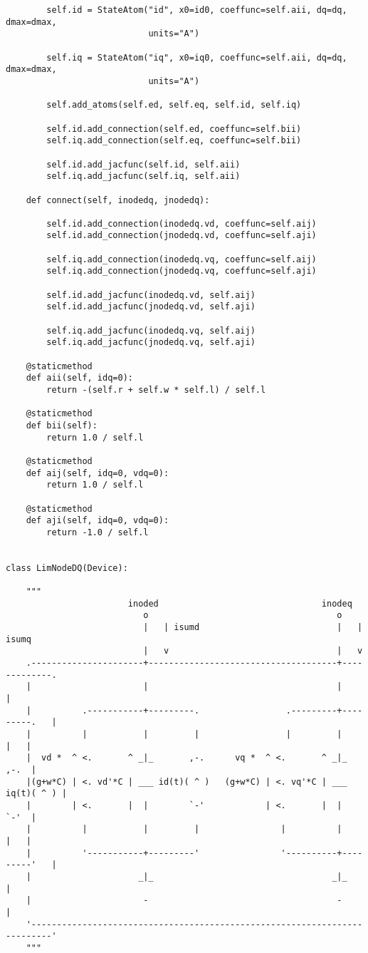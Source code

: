 \begin{lstlisting}
        self.id = StateAtom("id", x0=id0, coeffunc=self.aii, dq=dq, dmax=dmax,
                            units="A")

        self.iq = StateAtom("iq", x0=iq0, coeffunc=self.aii, dq=dq, dmax=dmax,
                            units="A")

        self.add_atoms(self.ed, self.eq, self.id, self.iq)

        self.id.add_connection(self.ed, coeffunc=self.bii)
        self.iq.add_connection(self.eq, coeffunc=self.bii)

        self.id.add_jacfunc(self.id, self.aii)
        self.iq.add_jacfunc(self.iq, self.aii)

    def connect(self, inodedq, jnodedq):

        self.id.add_connection(inodedq.vd, coeffunc=self.aij)
        self.id.add_connection(jnodedq.vd, coeffunc=self.aji)

        self.iq.add_connection(inodedq.vq, coeffunc=self.aij)
        self.iq.add_connection(jnodedq.vq, coeffunc=self.aji)

        self.id.add_jacfunc(inodedq.vd, self.aij)
        self.id.add_jacfunc(jnodedq.vd, self.aji)

        self.iq.add_jacfunc(inodedq.vq, self.aij)
        self.iq.add_jacfunc(jnodedq.vq, self.aji)

    @staticmethod
    def aii(self, idq=0):
        return -(self.r + self.w * self.l) / self.l

    @staticmethod
    def bii(self):
        return 1.0 / self.l

    @staticmethod
    def aij(self, idq=0, vdq=0):
        return 1.0 / self.l

    @staticmethod
    def aji(self, idq=0, vdq=0):
        return -1.0 / self.l


class LimNodeDQ(Device):

    """
                        inoded                                inodeq
                           o                                     o
                           |   | isumd                           |   | isumq
                           |   v                                 |   v
    .----------------------+-------------------------------------+-------------.
    |                      |                                     |             |
    |          .-----------+---------.                 .---------+---------.   |
    |          |           |         |                 |         |         |   |
    |  vd *  ^ <.       ^ _|_       ,-.      vq *  ^ <.       ^ _|_       ,-.  |
    |(g+w*C) | <. vd'*C | ___ id(t)( ^ )   (g+w*C) | <. vq'*C | ___ iq(t)( ^ ) |
    |        | <.       |  |        `-'            | <.       |  |        `-'  |
    |          |           |         |                |          |         |   |
    |          '-----------+---------'                '----------+---------'   |
    |                     _|_                                   _|_            |
    |                      -                                     -             |
    '--------------------------------------------------------------------------'
    """


\end{lstlisting}
